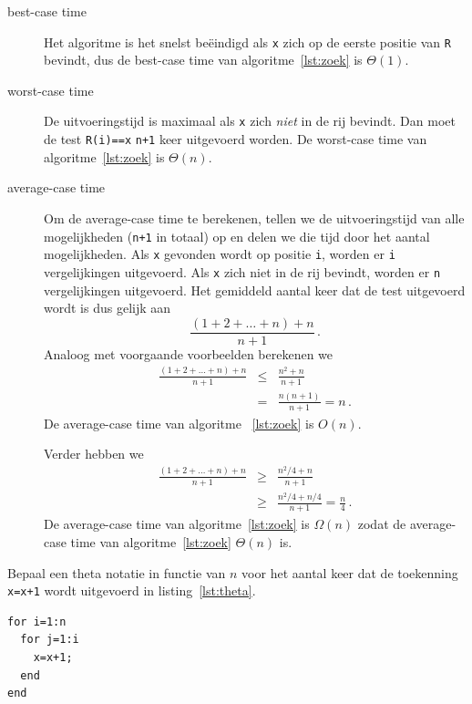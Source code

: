 \begin{description}
\item[best-case time] Het algoritme is het snelst beëindigd als \lstinline{x} zich op de eerste positie van \lstinline{R} bevindt, dus de best-case time van algoritme~\ref{lst:zoek} is $\Theta(1)$.

\item[worst-case time] De uitvoeringstijd is maximaal als \lstinline{x} zich \emph{niet} in de rij bevindt. Dan moet de test  \lstinline{R(i)==x} \lstinline{n+1} keer uitgevoerd worden. De worst-case time van algoritme~\ref{lst:zoek} is $\Theta(n)$.

\item[average-case time] Om de average-case time te berekenen, tellen we de uitvoeringstijd van alle mogelijkheden (\lstinline{n+1} in totaal) op en delen we die tijd door het aantal mogelijkheden. Als \lstinline{x} gevonden wordt op positie \lstinline{i}, worden er \lstinline{i} vergelijkingen uitgevoerd. Als \lstinline{x} zich niet in de rij bevindt, worden er \lstinline{n} vergelijkingen uitgevoerd. Het gemiddeld aantal keer dat de test uitgevoerd wordt is dus gelijk aan
\[
\frac{(1+2+\dots+n)+n}{n+1}\,.
\]
Analoog met voorgaande voorbeelden berekenen we
\begin{eqnarray*}
\frac{(1+2+\dots+n)+n}{n+1}&\leq& \frac{n^2+n}{n+1}\\
&=& \frac{n(n+1)}{n+1}=n\,.
\end{eqnarray*}
De average-case time van algoritme ~\ref{lst:zoek} is $O(n)$.

Verder hebben we
\begin{eqnarray*}
\frac{(1+2+\dots+n)+n}{n+1}&\geq& \frac{n^2/4+n}{n+1}\\
&\geq& \frac{n^2/4+n/4}{n+1}=\frac n4\,.
\end{eqnarray*}
De average-case time van  algoritme~\ref{lst:zoek} is $\Omega(n)$ zodat de average-case time van algoritme~\ref{lst:zoek} $\Theta(n)$ is.

\end{description}

\voorbeeld

Bepaal een theta notatie in functie van $n$ voor het aantal keer dat de toekenning \lstinline{x=x+1} wordt uitgevoerd in listing~\ref{lst:theta}.

\begin{lstlisting}[caption={Bepaal een theta notatie}, label={lst:theta}]
for i=1:n
  for j=1:i
    x=x+1;
  end
end
\end{lstlisting}

